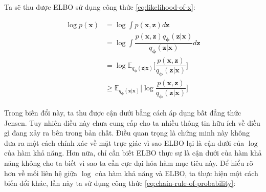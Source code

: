 \documentclass[14pt, a4paper]{article}
\numberwithin{equation}{section}
\numberwithin{figure}{section}
\numberwithin{dl}{section}
\numberwithin{md}{section}
\numberwithin{bd}{section}
\numberwithin{dn}{section}
\numberwithin{hq}{section}
\begin{document}
    Ta sẽ thu được ELBO sử dụng công thức \ref{eq:likelihood-of-x}:

    \begin{equation} \label{eq:Jensen-Derivation}
        \begin{aligned}
            \log p(\boldsymbol{x}) &= \log \int p(\boldsymbol{x}, \boldsymbol{z}) d \boldsymbol{z} \\
            &= \log \int \dfrac{p(\boldsymbol{x}, \boldsymbol{z}) q_{\boldsymbol{\phi}} (\boldsymbol{z} \vert \boldsymbol{x})}{q_{\boldsymbol{\phi}} (\boldsymbol{z} \vert \boldsymbol{x})} d \boldsymbol{z} \\
            &= \log \mathbb{E}_{q_{\boldsymbol{\phi}} (\boldsymbol{z} \vert \boldsymbol{x})} \Bigg \lbrack \dfrac{p(\boldsymbol{x}, \boldsymbol{z})}{q_{\boldsymbol{\phi}} (\boldsymbol{z} \vert \boldsymbol{x})} \Bigg \rbrack \\
            &\geq \mathbb{E}_{q_{\boldsymbol{\phi}} (\boldsymbol{z} \vert \boldsymbol{x})} \Bigg \lbrack \log \dfrac{p(\boldsymbol{x}, \boldsymbol{z})}{q_{\boldsymbol{\phi}} (\boldsymbol{z} \vert \boldsymbol{x})} \Bigg \rbrack
        \end{aligned}
    \end{equation}

    Trong biến đổi này, ta thu được cận dưới bằng cách áp dụng bất đẳng thức Jensen.
    Tuy nhiên điều này chưa cung cấp cho ta nhiều thông tin hữu ích về điều gì đang xảy ra bên trong bản chất.
    Điều quan trọng là chứng minh này không đưa ra một cách chính xác về mặt trực giác vì sao ELBO lại là cận dưới của $\log$ của hàm khả năng.
    Hơn nữa, chỉ cần biết ELBO thực sự là cận dưới của hàm khả năng không cho ta biết vì sao ta cần cực đại hóa hàm mục tiêu này.
    Để hiểu rõ hơn về mối liên hệ giữa $\log$ của hàm khả năng và ELBO, ta thực hiện một cách biến đổi khác, lần này ta sử dụng công thức \ref{eq:chain-rule-of-probability}:
\end{document}
